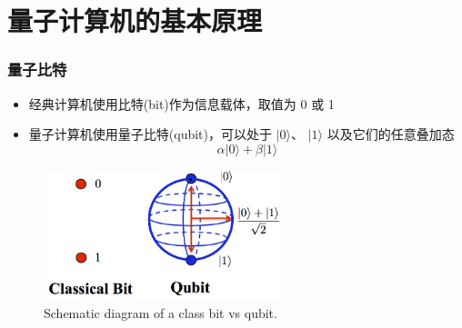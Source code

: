\section{量子计算机的基本原理}
\begin{frame}
    \frametitle{量子比特}
    \begin{itemize}
	    \item 经典计算机使用比特\textrm{(bit)}作为信息载体，取值为 0 或 1
	    \item 量子计算机使用量子比特\textrm{(qubit)}，可以处于 \( |0\rangle \)、 \( |1\rangle \) 以及它们的任意叠加态 
		    \begin{displaymath}
			    \alpha|0\rangle+\beta|1\rangle
		    \end{displaymath}
		    {\fontsize{7.5pt}{5.2pt}\selectfont{其中 \( \alpha \) 和 \( \beta \) 是复数，且 \( |\alpha|^2 + |\beta|^2 = 1 \)}}
    \end{itemize}
            \begin{figure}
        \centering
                \includegraphics[height=1.5in, width=2.7in, viewport=0 0 360 195,clip]{Figures/Quantum-Bit.png}
		\caption{\tiny{\textrm{Schematic diagram of a class bit vs qubit.}}}
		\label{Fig:Quantum-Bit}
            \end{figure}
\end{frame}

